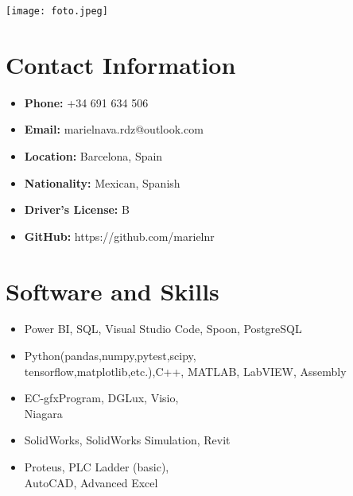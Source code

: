 \documentclass[11pt,a4paper]{article}
\begin{document}
\begin{minipage}[t]{.3\textwidth}
\justifying

\texttt{[image: foto.jpeg]} \\
\vspace{1.5em} %

\colorbox{verylightgray}{\parbox{\dimexpr\textwidth-2\fboxsep\relax}{\justifying
\vspace{.6em} %

\section*{Contact Information}
\footnotesize
\begin{itemize}
    \item \textbf{Phone:} +34 691 634 506
    \item \textbf{Email:} marielnava.rdz@outlook.com
    \item \textbf{Location:} Barcelona, Spain
    \item \textbf{Nationality:} Mexican, Spanish
    \item \textbf{Driver's License:} B
    \item \textbf{GitHub:} https://github.com/marielnr
\end{itemize}
\vspace{1em}

\section*{Software and Skills}
\footnotesize
\begin{itemize}
    \item Power BI, SQL, Visual Studio Code, Spoon, PostgreSQL
    \item Python(pandas,numpy,pytest,scipy,\\tensorflow,matplotlib,etc.),C++, MATLAB, LabVIEW, Assembly
    \item EC-gfxProgram, DGLux, Visio, \\Niagara
    \item SolidWorks, SolidWorks Simulation, Revit
    \item Proteus, PLC Ladder (basic), \\AutoCAD, Advanced Excel
\end{itemize}
\vspace{1em}

}}
\end{minipage}
\end{document}
